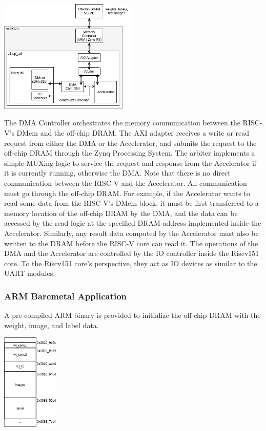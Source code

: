 \documentclass[11pt]{article}
\begin{document}
\begin{center}
\includegraphics[width=0.5\textwidth]{images/full_system.png}
\end{center}

The DMA Controller orchestrates the memory communication between the RISC-V's DMem and the off-chip DRAM. The AXI adapter receives a write or read request from either the DMA or the Accelerator, and submits the request to the off-chip DRAM through the Zynq Processing System. The arbiter implements a simple MUXing logic to service the request and response from the Accelerator if it is currently running, otherwise the DMA. Note that there is no direct communication between the RISC-V and the Accelerator. All communication must go through the off-chip DRAM. For example, if the Accelerator wants to read some data from the RISC-V's DMem block, it must be first transferred to a memory location of the off-chip DRAM by the DMA, and the data can be accessed by the read logic at the specified DRAM address implemented inside the Accelerator. Similarly, any result data computed by the Accelerator must also be written to the DRAM before the RISC-V core can read it. The operations of the DMA and the Accelerator are controlled by the IO controller inside the Riscv151 core. To the Riscv151 core's perspective, they act as IO devices as similar to the UART modules.

\subsubsection{ARM Baremetal Application}

A pre-compiled ARM binary is provided to initialize the off-chip DRAM with the weight, image, and label data.

\begin{center}
\includegraphics[width=0.2\textwidth]{images/ddr_layout.png}
\end{center}
\end{document}

